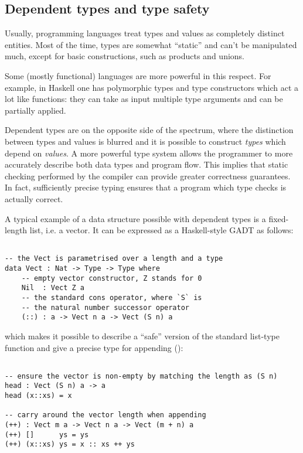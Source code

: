 \subsection{Dependent types and type safety}

Usually, programming languages treat types and values as completely distinct
entities. Most of the time, types are somewhat ``static'' and can't be
manipulated much, except for basic constructions, such as products and unions.

Some (mostly functional) languages are more powerful in this respect. For
example, in Haskell one has polymorphic types and type constructors which act a
lot like functions: they can take as input multiple type arguments and can be
partially applied.

Dependent types are on the opposite side of the spectrum, where the distinction
between types and values is blurred and it is possible to construct
\emph{types} which depend on \emph{values}. A more powerful type system allows
the programmer to more accurately describe both data types and program flow.
This implies that static checking performed by the compiler can provide greater
correctness guarantees. In fact, sufficiently precise typing ensures that a
program which type checks is actually correct.

A typical example of a data structure possible with dependent types is a
fixed-length list, i.e. a vector. It can be expressed as a Haskell-style GADT
as follows:

\begin{BVerbatim}

-- the Vect is parametrised over a length and a type
data Vect : Nat -> Type -> Type where
    -- empty vector constructor, Z stands for 0
    Nil  : Vect Z a
    -- the standard cons operator, where `S` is
    -- the natural number successor operator
    (::) : a -> Vect n a -> Vect (S n) a

\end{BVerbatim}

which makes it possible to describe a ``safe'' version of the standard
list-type function  and give a precise type for appending (\code{++}):

\begin{BVerbatim}

-- ensure the vector is non-empty by matching the length as (S n)
head : Vect (S n) a -> a
head (x::xs) = x

-- carry around the vector length when appending
(++) : Vect m a -> Vect n a -> Vect (m + n) a
(++) []      ys = ys
(++) (x::xs) ys = x :: xs ++ ys

\end{BVerbatim}

